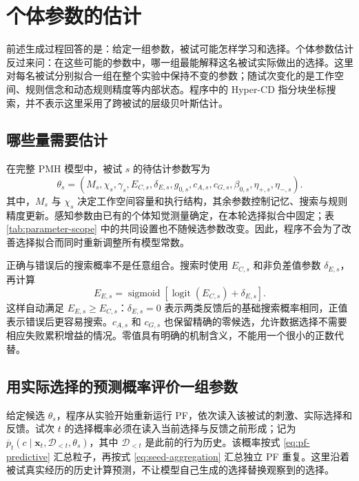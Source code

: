 \documentclass[12pt]{article}
\newcommand{\logit}{\operatorname{logit}}
\newcommand{\sigmoid}{\operatorname{sigmoid}}
\begin{document}
\section{个体参数的估计}
\label{sec:individual-estimation}

前述生成过程回答的是：给定一组参数，被试可能怎样学习和选择。个体参数估计反过来问：在这些可能的参数中，哪一组最能解释这名被试实际做出的选择。这里对每名被试分别拟合一组在整个实验中保持不变的参数；随试次变化的是工作空间、规则信念和动态规则精度等内部状态。程序中的 Hyper-CD 指分块坐标搜索，并不表示这里采用了跨被试的层级贝叶斯估计。

\subsection{哪些量需要估计}

在完整 PMH 模型中，被试 $s$ 的待估计参数写为
\begin{equation}
\theta_s=(M_s,\chi_s,\gamma_s,E_{C,s},\delta_{E,s},
 g_{0,s},c_{A,s},c_{G,s},\beta_{0,s},\eta_{+,s},\eta_{-,s}).
\label{eq:subject-parameter-vector}
\end{equation}
其中，$M_s$ 与 $\chi_s$ 决定工作空间容量和执行结构，其余参数控制记忆、搜索与规则精度更新。感知参数由已有的个体知觉测量确定，在本轮选择拟合中固定；表 \ref{tab:parameter-scope} 中的共同设置也不随候选参数改变。因此，程序不会为了改善选择拟合而同时重新调整所有模型常数。

正确与错误后的搜索概率不是任意组合。搜索时使用 $E_{C,s}$ 和非负差值参数 $\delta_{E,s}$，再计算
\begin{equation}
E_{E,s}=\sigmoid\!\left[\logit(E_{C,s})+\delta_{E,s}\right].
\label{eq:fit-event-parameterization}
\end{equation}
这样自动满足 $E_{E,s}\geq E_{C,s}$：$\delta_{E,s}=0$ 表示两类反馈后的基础搜索概率相同，正值表示错误后更容易搜索。$c_{A,s}$ 和 $c_{G,s}$ 也保留精确的零候选，允许数据选择不需要相应失败累积增益的情况。零值具有明确的机制含义，不能用一个很小的正数代替。

\subsection{用实际选择的预测概率评价一组参数}

给定候选 $\theta_s$，程序从实验开始重新运行 PF，依次读入该被试的刺激、实际选择和反馈。试次 $t$ 的选择概率必须在读入当前选择与反馈之前形成；记为 $\overline p_t(c\mid\bm x_t,\mathcal D_{<t},\theta_s)$，其中 $\mathcal D_{<t}$ 是此前的行为历史。该概率按式 \eqref{eq:pf-predictive} 汇总粒子，再按式 \eqref{eq:seed-aggregation} 汇总独立 PF 重复。这里沿着被试真实经历的历史计算预测，不让模型自己生成的选择替换观察到的选择。
\end{document}
